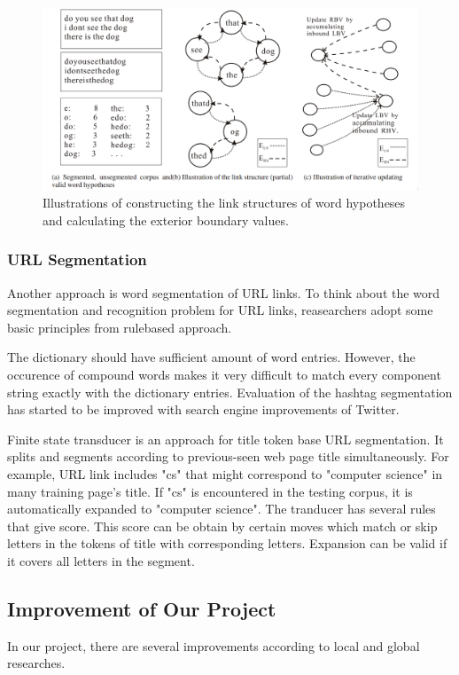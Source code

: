 \documentclass[12pt]{comjnl}
\begin{document}
\begin{figure}[htbp]
\centering
\includegraphics[width=7in]{paper3.png}
\caption{Illustrations of constructing the link structures of word hypotheses and calculating the exterior boundary values.}\label{fig:paper1}
\end{figure}

\subsubsection{URL Segmentation}
Another approach is word segmentation of URL links. To think about the word segmentation and
recognition problem for URL links, reasearchers adopt some basic principles from rule­based
approach.

The dictionary should have sufficient amount of word entries. However, the occurence
of compound words makes it very difficult to match every component string exactly with the
dictionary entries. Evaluation of the hashtag segmentation has started to be improved with search engine
improvements of Twitter.

Finite state transducer is an approach for title token base URL segmentation. It splits and segments according to previous-seen web page title simultaneously. For example, URL link includes "cs" that might correspond to "computer science" in many training page's title. If "cs" is encountered in the testing corpus, it is automatically expanded to "computer science". The tranducer has several rules that give score. This score can be obtain by certain moves which match or skip letters in the tokens of title with corresponding letters. Expansion can be valid if it covers all letters in the segment.


\subsection{Improvement of Our Project}
In our project, there are several improvements according to local and global researches.
\end{document}
